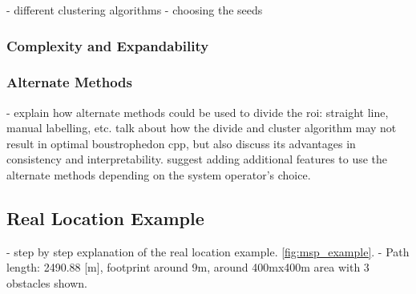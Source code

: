 - different clustering algorithms
- choosing the seeds

\subsubsection{Complexity and Expandability}

\subsubsection{Alternate Methods}

- explain how alternate methods could be used to divide the roi: straight line, manual labelling, etc. talk about how the divide and cluster algorithm may not result in optimal boustrophedon cpp, but also discuss its advantages in consistency and interpretability. suggest adding additional features to use the alternate methods depending on the system operator's choice. 

\subsection{Real Location Example}
\label{sec:msp_example}

- step by step explanation of the real location example. \ref{fig:msp_example}.
- Path length: 2490.88 [m], footprint around 9m, around 400mx400m area with 3 obstacles shown. 

